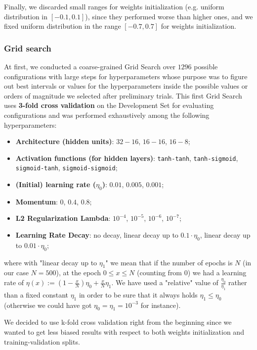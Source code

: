 Finally, we discarded small ranges for weights initialization (e.g. uniform distribution in $[-0.1, 0.1]$), since they performed worse than higher ones,
and we fixed uniform distribution in the range $[-0.7, 0.7]$ for weights initialization.

\subsubsection{Grid search}

At first, we conducted a coarse-grained Grid Search over $1296$ possible configurations with large steps for hyperparameters whose purpose was to figure out best intervals or values for the hyperparameters inside the possible values or orders of magnitude we selected after preliminary trials. This first Grid Search uses \textbf{3-fold cross validation} on the Development Set for evaluating configurations and was performed exhaustively among the following hyperparameters:

\begin{itemize}
    \item \textbf{Architecture (hidden units)}: {$32-16$, $16-16$, $16-8$};
    \item \textbf{Activation functions (for hidden layers)}: {\texttt{tanh-tanh}, \texttt{tanh-sigmoid}, \texttt{sigmoid-tanh}, \texttt{sigmoid-sigmoid}};
    \item \textbf{(Initial) learning rate ($\eta_0$)}: {$0.01$, $0.005$, $0.001$};
    \item \textbf{Momentum}: {$0$, $0.4$, $0.8$};
    \item \textbf{L2 Regularization Lambda}: {$10^{-4}$, $10^{-5}$, $10^{-6}$, $10^{-7}$};
    \item \textbf{Learning Rate Decay}: {no decay, linear decay up to $0.1 \cdot \eta_0$, linear decay up to $0.01 \cdot \eta_0$};
\end{itemize}

where with "linear decay up to $\eta_1$" we mean that if the number of epochs is $N$ (in our case $N = 500$), at the epoch $0 \leq x \le N$ (counting from $0$) we had a learning rate of $\eta(x) := \left(1 - \frac{x}{N}\right)\eta_0 + \frac{x}{N} \eta_1$. We have used a "relative" value of $\frac{\eta_0}{\eta_1}$ rather than a fixed constant $\eta_1$ in order to be sure that it always holds $\eta_1 \leq \eta_0$ (otherwise we could have got $\eta_0 = \eta_1 = 10^{-3}$ for instance).

We decided to use k-fold cross validation right from the beginning since we wanted to get less biased results with respect to both weights initialization and training-validation splits.

